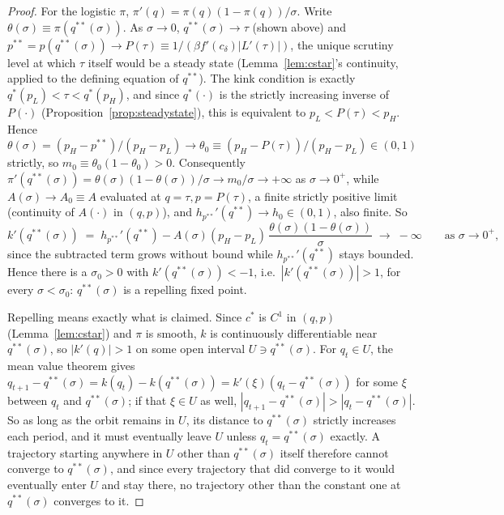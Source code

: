 \begin{proof}
For the logistic $\pi$, $\pi'(q) = \pi(q)(1-\pi(q))/\sigma$. Write $\theta(\sigma) \equiv \pi(q^{**}(\sigma))$. As $\sigma\to0$, $q^{**}(\sigma)\to\tau$ (shown above) and $p^{**}=p(q^{**}(\sigma)) \to P(\tau) \equiv 1/(\beta f'(c_\delta)|L'(\tau)|)$, the unique scrutiny level at which $\tau$ itself would be a steady state (Lemma~\ref{lem:cstar}'s continuity, applied to the defining equation of $q^{**}$). The kink condition is exactly $q^*(p_L)<\tau<q^*(p_H)$, and since $q^*(\cdot)$ is the strictly increasing inverse of $P(\cdot)$ (Proposition~\ref{prop:steadystate}), this is equivalent to $p_L < P(\tau) < p_H$. Hence $\theta(\sigma) = (p_H-p^{**})/(p_H-p_L) \to \theta_0 \equiv (p_H-P(\tau))/(p_H-p_L) \in (0,1)$ strictly, so $m_0 \equiv \theta_0(1-\theta_0) > 0$. Consequently $\pi'(q^{**}(\sigma)) = \theta(\sigma)(1-\theta(\sigma))/\sigma \to m_0/\sigma \to +\infty$ as $\sigma\to0^+$, while $A(\sigma) \to A_0 \equiv A$ evaluated at $q=\tau,p=P(\tau)$, a finite strictly positive limit (continuity of $A(\cdot)$ in $(q,p)$), and $h_{p^{**}}'(q^{**}) \to h_0 \in (0,1)$, also finite. So
\[
k'(q^{**}(\sigma)) \;=\; h_{p^{**}}'(q^{**}) - A(\sigma)(p_H-p_L)\,\frac{\theta(\sigma)(1-\theta(\sigma))}{\sigma} \;\longrightarrow\; -\infty \qquad \text{as } \sigma \to 0^+,
\]
since the subtracted term grows without bound while $h_{p^{**}}'(q^{**})$ stays bounded. Hence there is a $\sigma_0 > 0$ with $k'(q^{**}(\sigma)) < -1$, i.e.\ $|k'(q^{**}(\sigma))| > 1$, for every $\sigma < \sigma_0$: $q^{**}(\sigma)$ is a repelling fixed point.

Repelling means exactly what is claimed. Since $c^*$ is $C^1$ in $(q,p)$ (Lemma~\ref{lem:cstar}) and $\pi$ is smooth, $k$ is continuously differentiable near $q^{**}(\sigma)$, so $|k'(q)|>1$ on some open interval $U \ni q^{**}(\sigma)$. For $q_t \in U$, the mean value theorem gives $q_{t+1}-q^{**}(\sigma) = k(q_t)-k(q^{**}(\sigma)) = k'(\xi)(q_t-q^{**}(\sigma))$ for some $\xi$ between $q_t$ and $q^{**}(\sigma)$; if that $\xi \in U$ as well, $|q_{t+1}-q^{**}(\sigma)| > |q_t-q^{**}(\sigma)|$. So as long as the orbit remains in $U$, its distance to $q^{**}(\sigma)$ strictly increases each period, and it must eventually leave $U$ unless $q_t=q^{**}(\sigma)$ exactly. A trajectory starting anywhere in $U$ other than $q^{**}(\sigma)$ itself therefore cannot converge to $q^{**}(\sigma)$, and since every trajectory that did converge to it would eventually enter $U$ and stay there, no trajectory other than the constant one at $q^{**}(\sigma)$ converges to it.
\end{proof}
